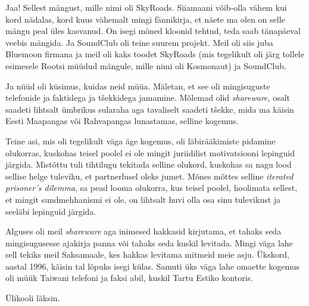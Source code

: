 
Jaa!  Sellest mängust, mille nimi oli SkyRoads. Siiamaani võib-olla vähem kui kord nädalas, kord kuus vähemalt mingi fännikirja, et näete ma olen on selle mängu peal üles kasvanud. On isegi mõned kloonid tehtud,  teda saab tänapäeval veebis mängida. Ja SoundClub oli teine suurem projekt. Meil oli siis juba Bluemoon firmana ja meil oli kaks toodet SkyRoads (mis tegelikult oli järg tollele esimesele Rootsi müüdud mängule, mille nimi oli Kosmonaut) ja SoundClub. 

Ja nüüd oli küsimus, kuidas neid müüa. Mäletan, et see oli mingisuguste telefonide ja faktidega ja tšekkidega jamamine. Mõlemad olid \emph{shareware}, osalt saadeti lihtsalt ümbrikus sularaha aga tavaliselt saadeti tšekke, mida ma käisin Eesti Maapangas või Rahvapangas lunastamas, selline kogemus. 

Teine asi, mis oli tegelikult väga äge kogemus, oli läbirääkimiste pidamine olukorras, kuskohas teisel poolel ei ole mingit juriidilist motivatsiooni lepinguid järgida. Mistõttu tuli tihtilugu tekitada selline olukord, kuskohas sa nagu lood sellise helge tuleviku, et partnerlusel oleks jumet. Mõnes mõttes selline \emph{iterated prisoner's dilemma}, sa pead looma olukorra, kus teisel poolel, hoolimata sellest, et mingit sundmehhanismi ei ole, on lihtsalt huvi olla osa sinu tulevikust ja seeläbi lepinguid järgida.

Alguses oli meil \emph{shareware} aga inimesed hakkasid kirjutama, et tahaks seda mingisugusesse ajakirja panna või tahaks seda kuskil levitada. Mingi väga lahe sell tekiks meil Saksamaale, kes hakkas levitama mitmeid meie asju. Ükskord, aastal 1996, käisin tal lõpuks isegi külas. Samuti üks väga lahe omaette kogemus oli müük Taiwani telefoni ja faksi abil, kuskil Tartu Estiko kontoris. 


Ülikooli läksin.


